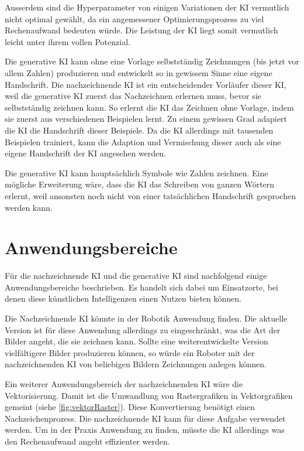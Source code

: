 Ausserdem sind die Hyperparameter von einigen Variationen der KI vermutlich
nicht optimal gewählt, da ein angemessener Optimierungsprozess zu viel
Rechenaufwand bedeuten würde. Die Leistung der KI liegt somit vermutlich leicht
unter ihrem vollen Potenzial.

Die generative KI kann ohne eine Vorlage selbstständig Zeichnungen (bis jetzt
vor allem Zahlen) produzieren und entwickelt so in gewissem Sinne eine eigene
Handschrift. Die nachzeichnende KI ist ein entscheidender Vorläufer dieser KI,
weil die generative KI zuerst das Nachzeichnen erlernen muss, bevor sie
selbstständig zeichnen kann. So erlernt die KI das Zeichnen ohne Vorlage, indem
sie zuerst aus verschiedenen Beispielen lernt. Zu einem gewissen Grad adapiert
die KI die Handschrift dieser Beispiele. Da die KI allerdings mit tausenden
Beispielen trainiert, kann die Adaption und Vermischung dieser auch als eine
eigene Handschrift der KI angesehen werden.

Die generative KI kann hauptsächlich Symbole wie Zahlen zeichnen. Eine mögliche
Erweiterung wäre, dass die KI das Schreiben von ganzen Wörtern erlernt, weil
ansonsten noch nicht von einer tatsächlichen Handschrift gesprochen werden kann.


\section{Anwendungsbereiche}\label{chap:d_anwendung} Für die nachzeichnende KI
und die generative KI sind nachfolgend einige Anwendungsbereiche beschrieben. Es
handelt sich dabei um Einsatzorte, bei denen diese künstlichen Intelligenzen
einen Nutzen bieten können.

Die Nachzeichnende KI könnte in der Robotik Anwendung finden. Die aktuelle
Version ist für diese Anwendung allerdings zu eingeschränkt, was die Art der
Bilder angeht, die sie zeichnen kann. Sollte eine weiterentwickelte Version
vielfältigere Bilder produzieren können, so würde ein Roboter mit der
nachzeichnenden KI von beliebigen Bildern Zeichnungen anlegen können.

Ein weiterer Anwendungsbereich der nachzeichnenden KI wäre die Vektorisierung.
Damit ist die Umwandlung von Rastergrafiken in Vektorgrafiken gemeint (siehe
\autoref{fig:vektorRaster}). Diese Konvertierung benötigt einen
Nachzeichenprozess. Die nachzeichnende KI kann für diese Aufgabe verwendet
werden. Um in der Praxis Anwendung zu finden, müsste die KI allerdings was den
Rechenaufwand angeht effizienter werden.

